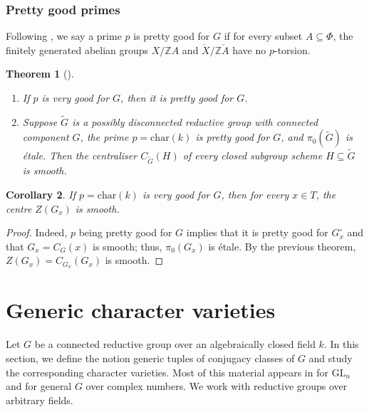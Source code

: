 \documentclass[12pt]{amsart}
\theoremstyle{plain}
\newtheorem{thm}{Theorem}
\newtheorem{cor}[thm]{Corollary}
\theoremstyle{definition}
\theoremstyle{remark}
\newcommand{\GL}{\mathrm{GL}}
\newcommand{\bZ}{\mathbb{Z}}
\begin{document}
 


\subsubsection{Pretty good primes}\label{sss:prettygood} Following \cite{Herpel}, we say a prime $p$ is pretty good for $G$ if for every subset $A\subseteq \Phi$, the finitely generated abelian groups $X/\bZ A $ and $\check{X}/\bZ \check{A}$ have no $p$-torsion.   

\begin{thm}[\cite{Herpel}]  \label{t:Herpel} 
\begin{enumerate} 
\item[(i)] If $p$ is very good for $G$, then it is pretty good for $G$. 
\item[(ii)] 
Suppose $\tilde{G}$ is a possibly disconnected reductive group with connected component $G$, the prime $p=\mathrm{char}(k)$ is pretty good for $G$, and $\pi_0(\widetilde{G})$ is \'etale. Then the centraliser $C_{\tilde{G}}(H)$ of every closed subgroup scheme $H\subseteq \tilde{G}$ is smooth. 
\end{enumerate} 
\end{thm} 

\begin{cor} \label{c:etale}
If $p=\mathrm{char}(k)$ is very good for $G$, then for every $x\in T$, the centre $Z(G_x)$ is smooth. 
\end{cor} 

\begin{proof} 
Indeed, $p$ being pretty good for $G$ implies that it is pretty good for $G_x^\circ$ and that $G_x=C_G(x)$ is smooth; thus, $\pi_0(G_x)$ is \'etale. By the previous theorem,  $Z(G_x)=C_{G_x}(G_x)$ is smooth. 
\end{proof} 





\section{Generic character varieties} \label{s:geometry}
Let $G$ be a connected reductive group over an algebraically closed field $k$. In this section, we define the notion generic tuples of conjugacy classes of $G$ and study the corresponding character varieties. Most of this material appears in \cite{HLRV11} for $\GL_n$ and \cite{Boalch14} for general $G$ over complex numbers.  We work with reductive groups over arbitrary fields.  
\end{document}
